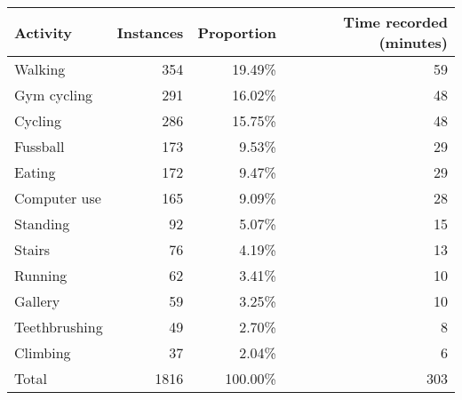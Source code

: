 \begin{tabular}{lrrr}
\toprule
      Activity &  Instances &  Proportion &  Time recorded (minutes) \\
\midrule
       Walking &     354 &      19.49\% &                       59 \\
    Gym cycling &     291 &      16.02\% &                       48 \\
       Cycling &     286 &      15.75\% &                       48 \\
      Fussball &     173 &       9.53\% &                       29 \\
        Eating &     172 &       9.47\% &                       29 \\
   Computer use &     165 &       9.09\% &                       28 \\
      Standing &      92 &       5.07\% &                       15 \\
        Stairs &      76 &       4.19\% &                       13 \\
       Running &      62 &       3.41\% &                       10 \\
       Gallery &      59 &       3.25\% &                       10 \\
 Teethbrushing &      49 &       2.70\% &                        8 \\
      Climbing &      37 &       2.04\% &                        6 \\
\midrule
         Total &    1816 &     100.00\% &                      303 \\
\bottomrule
\end{tabular}
